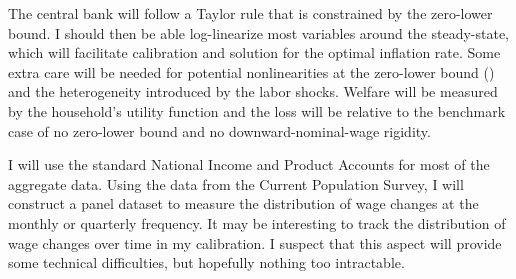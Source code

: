 \documentclass[12pt,a4paper]{article}            %
\begin{document}
The central bank will follow a Taylor rule that is constrained by the zero-lower bound.
I should then be able log-linearize most variables around the steady-state, which will facilitate calibration and solution for the optimal inflation rate.
Some extra care will be needed for potential nonlinearities at the zero-lower bound (\citealt{fv_gordon_gq_rr_2012}) and the heterogeneity introduced by the labor shocks.
Welfare will be measured by the household's utility function and the loss will be relative to the benchmark case of no zero-lower bound and no downward-nominal-wage rigidity.

I will use the standard National Income and Product Accounts for most of the aggregate data.
Using the data from the Current Population Survey, I will construct a panel dataset to measure the distribution of wage changes at the monthly or quarterly frequency.
It may be interesting to track the distribution of wage changes over time in my calibration.
I suspect that this aspect will provide some technical difficulties, but hopefully nothing too intractable.







\end{document}
